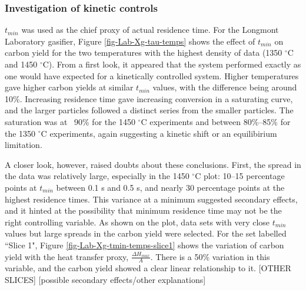 \documentclass[11pt,twocolumn]{article}
\begin{document}
\subsubsection*{Investigation of kinetic controls}

$t_{min}$ was used as the chief proxy of actual residence time.  For the Longmont Laboratory gasifier, Figure \ref{fig-Lab-Xg-tau-temps} shows the effect of $t_{min}$ on carbon yield for the two temperatures with the highest density of data (1350 $^{\circ}$C and 1450 $^{\circ}$C).  From a first look, it appeared that the system performed exactly as one would have expected for a kinetically controlled system.  Higher temperatures gave higher carbon yields at similar $t_{min}$ values, with the difference being around 10\%.  Increasing residence time gave increasing conversion in a saturating curve, and the larger particles followed a distinct series from the smaller particles.  The saturation was at ~90\% for the 1450 $^{\circ}$C experiments and between 80\%--85\% for the 1350 $^{\circ}$C experiments, again suggesting a kinetic shift or an equilibirium limitation.

A closer look, however, raised doubts about these conclusions.  First, the spread in the data was relatively large, especially in the 1450 $^{\circ}$C plot: 10--15 percentage points at $t_{min}$ between 0.1 s and 0.5 s, and nearly 30 percentage points at the highest residence times.  This variance at a minimum suggested secondary effects, and it hinted at the possibility that minimum residence time may not be the right controlling variable.  As shown on the plot, data sets with very close $t_{min}$ values but large spreads in the carbon yield were selected.  For the set labelled ``Slice 1", Figure \ref{fig-Lab-Xg-tmin-temps-slice1} shows the variation of carbon yield with the heat transfer proxy, $\frac{\Delta H_{max}}{A}$.  There is a 50\% variation in this variable, and the carbon yield showed a clear linear relationship to it.  [OTHER SLICES] [possible secondary effects/other explanations]
\end{document}
